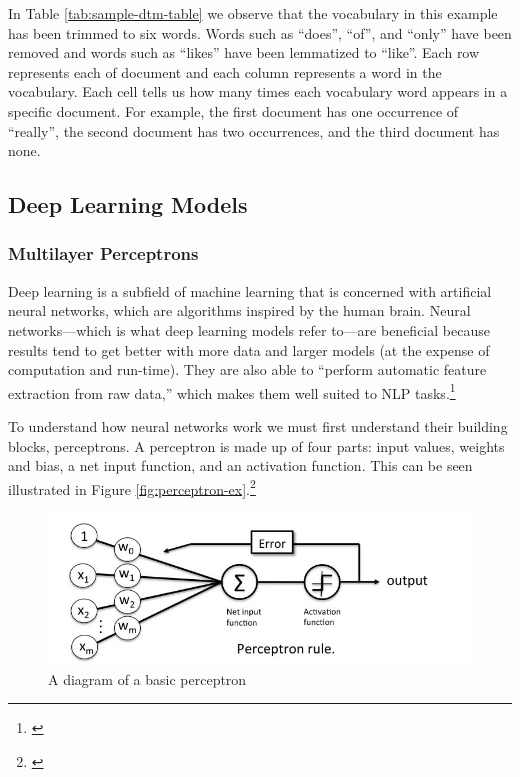 \documentclass[12pt]{article}
\begin{document}
In Table \ref{tab:sample-dtm-table} we observe that the vocabulary in
this example has been trimmed to six words. Words such as ``does'',
``of'', and ``only'' have been removed and words such as ``likes'' have
been lemmatized to ``like''. Each row represents each of document and
each column represents a word in the vocabulary. Each cell tells us how
many times each vocabulary word appears in a specific document. For
example, the first document has one occurrence of ``really'', the second
document has two occurrences, and the third document has none.

\hypertarget{deep-learning-models}{%
\subsection{Deep Learning Models}\label{deep-learning-models}}

\hypertarget{multilayer-perceptrons}{%
\subsubsection{Multilayer Perceptrons}\label{multilayer-perceptrons}}

Deep learning is a subfield of machine learning that is concerned with
artificial neural networks, which are algorithms inspired by the human
brain. Neural networks---which is what deep learning models refer
to---are beneficial because results tend to get better with more data
and larger models (at the expense of computation and run-time). They are
also able to ``perform automatic feature extraction from raw data,''
which makes them well suited to NLP tasks.\footnote{\citet{brownleeWhatDeepLearning2019}}

To understand how neural networks work we must first understand their
building blocks, perceptrons. A perceptron is made up of four parts:
input values, weights and bias, a net input function, and an activation
function. This can be seen illustrated in Figure
\ref{fig:perceptron-ex}.\footnote{\citet{WhatPerceptronSimplilearn}}

\begin{figure}[H]

{\centering \includegraphics[width=0.9\linewidth,]{images/perceptron-example} 

}

\caption{\label{fig:perceptron-ex}A diagram of a basic perceptron}\label{fig:unnamed-chunk-4}
\end{figure}
\end{document}
